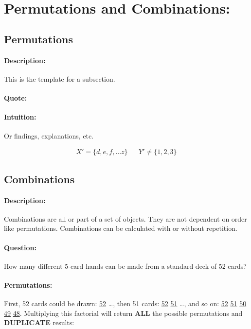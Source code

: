 \documentclass[12pt]{article}
\begin{document}
\section*{Permutations and Combinations:}

  \subsection{Permutations}
  \paragraph{Description:} This is the template for a subsection.
  \paragraph{Quote:} 
  \paragraph{Intuition:} Or findings, explanations, etc.

  \begin{align*}
    X' = \{d, e, f,\ldots z\} && Y' \neq \{1, 2, 3\}
  \end{align*}


  \subsection{Combinations}
  \paragraph{Description:}
Combinations are all or part of a set of objects. They are not dependent on order like permutations. Combinations can be calculated with or without repetition.

  \paragraph{Question:}
How many different 5-card hands can be made from a standard deck of 52 cards?

  \paragraph{Permutations:}
First, 52 cards could be drawn: \underline{52} \ldots, then 51 cards: \underline{52} \underline{51} \ldots, and so on: \underline{52} \underline{51} \underline{50} \underline{49} \underline{48}. Multiplying this factorial will return \textbf{ALL} the possible permutations and \textbf{DUPLICATE} results:
\end{document}
